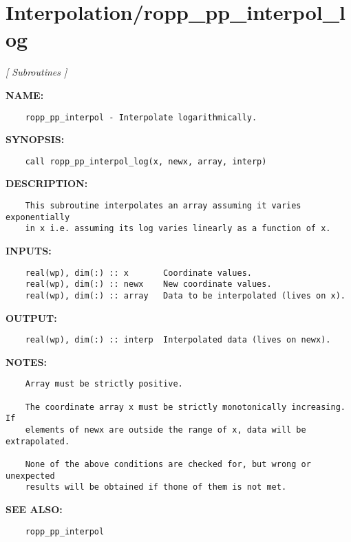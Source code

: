 \section{Interpolation/ropp\_pp\_interpol\_log}
\textsl{[ Subroutines ]}

\label{ch:robo26}
\label{ch:Interpolation_ropp_pp_interpol_log}
\textbf{NAME:}\hspace{0.08in}\begin{Verbatim}
    ropp_pp_interpol - Interpolate logarithmically.
\end{Verbatim}
\textbf{SYNOPSIS:}\hspace{0.08in}\begin{Verbatim}
    call ropp_pp_interpol_log(x, newx, array, interp)
\end{Verbatim}
\textbf{DESCRIPTION:}\hspace{0.08in}\begin{Verbatim}
    This subroutine interpolates an array assuming it varies exponentially
    in x i.e. assuming its log varies linearly as a function of x.  
\end{Verbatim}
\textbf{INPUTS:}\hspace{0.08in}\begin{Verbatim}
    real(wp), dim(:) :: x       Coordinate values.
    real(wp), dim(:) :: newx    New coordinate values.
    real(wp), dim(:) :: array   Data to be interpolated (lives on x).
\end{Verbatim}
\textbf{OUTPUT:}\hspace{0.08in}\begin{Verbatim}
    real(wp), dim(:) :: interp  Interpolated data (lives on newx).
\end{Verbatim}
\textbf{NOTES:}\hspace{0.08in}\begin{Verbatim}
    Array must be strictly positive.

    The coordinate array x must be strictly monotonically increasing. If
    elements of newx are outside the range of x, data will be extrapolated.

    None of the above conditions are checked for, but wrong or unexpected
    results will be obtained if thone of them is not met. 
\end{Verbatim}
\textbf{SEE ALSO:}\hspace{0.08in}\begin{Verbatim}
    ropp_pp_interpol
\end{Verbatim}
